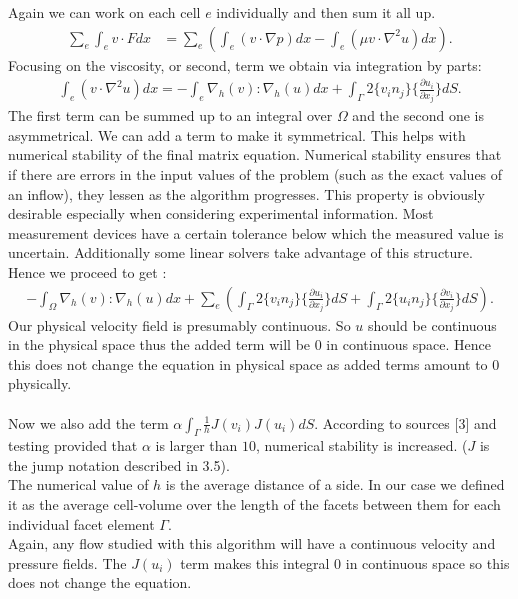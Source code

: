 \documentclass[11pt,twoside,a4paper]{article}
\begin{document}
Again we can work on each cell $e$ individually and then sum it all up.
\begin{align*}
\sum_e \int_e v \cdot F dx &= \sum_e (\int_e (v \cdot \nabla p) dx - \int_e (\mu v \cdot \nabla^2 u) dx) .
\end{align*}
Focusing on the viscosity, or second, term we obtain via integration by parts:
\begin{align*}
\int_e (v \cdot \nabla^2 u) dx = - \int_e \nabla_h(v) : \nabla_h(u) dx + \int_\Gamma 2 \{ v_i n_j \} \{ \frac{\partial u_i}{\partial x_j}\} dS .
\end{align*}
The first term can be summed up to an integral over $\Omega$ and the second one is asymmetrical. We can add a term to make it symmetrical. This helps with numerical stability of the final matrix equation. Numerical stability ensures that if there are errors in the input values of the problem (such as the exact values of an inflow), they lessen as the algorithm progresses. This property is obviously desirable especially when considering experimental information. Most measurement devices have a certain tolerance below which the measured value is uncertain. Additionally some linear solvers take advantage of this structure.\\
Hence we proceed to get :
\begin{align*}
-  \int_\Omega \nabla_h(v) : \nabla_h(u) dx + \sum_e( \int_\Gamma 2 \{ v_i n_j \} \{ \frac{\partial u_i}{\partial x_j}\} dS + \int_\Gamma 2 \{ u_i n_j \} \{ \frac{\partial v_i}{\partial x_j}\} dS) .
\end{align*}
Our physical velocity field is presumably continuous.
So $u$ should be continuous in the physical space thus the added term will be $0$ in continuous space. Hence this does not change the equation in physical space as added terms amount to $0$ physically.\\
\\
Now we also add the term $\alpha \int_\Gamma \frac{1}{h}  J(v_i) J(u_i) dS$. According to sources [3] and testing provided that  $\alpha$ is larger than $10$, numerical stability is increased.
($J$ is the jump notation described in 3.5).\\
The numerical value of $h$ is the average distance of a side. In our case we defined it as the average cell-volume over the length of the facets between them for each individual facet element $\Gamma$.\\
Again, any flow studied with this algorithm will have a continuous velocity and pressure fields. The $J(u_i)$ term makes this integral $0$ in continuous space so this does not change the equation.\\
\end{document}
